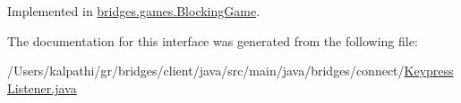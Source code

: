 Implemented in \mbox{\hyperlink{classbridges_1_1games_1_1_blocking_game_a53b1b38826785ee7c7a13f486b7b72ba}{bridges.\+games.\+Blocking\+Game}}.



The documentation for this interface was generated from the following file\+:\begin{DoxyCompactItemize}
\item 
/\+Users/kalpathi/gr/bridges/client/java/src/main/java/bridges/connect/\mbox{\hyperlink{_keypress_listener_8java}{Keypress\+Listener.\+java}}\end{DoxyCompactItemize}
